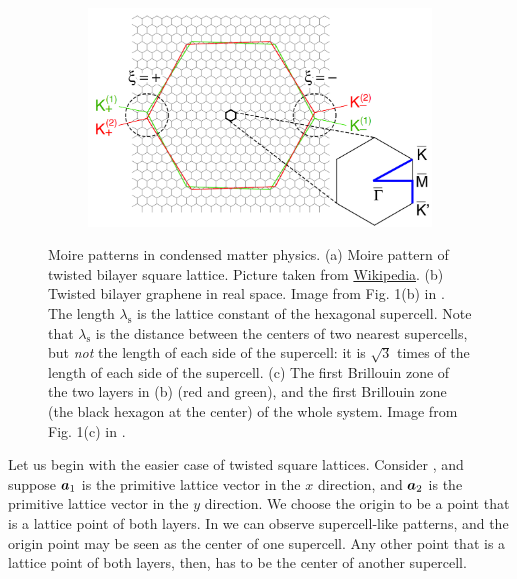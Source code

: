\documentclass[hyperref, a4paper]{article}
\begin{document}
\begin{figure}
\begin{subfigure}{0.3\textwidth}
        \subcaption{}
        \label{fig:hexagonal-moire}
    \end{subfigure}
    \begin{subfigure}{0.3\textwidth}
        \centering
        \includegraphics[width=\textwidth]{structure/moire-k-graphene.PNG}
        \subcaption{}
        \label{fig:1bz-1}
    \end{subfigure}
    \caption{Moire patterns in condensed matter physics.
    (a) Moire pattern of twisted bilayer square lattice. 
    Picture taken from \href{https://en.wikipedia.org/wiki/Moir\%C3\%A9\_pattern\#/media/File:Moir\%C3\%A9\_grid.svg}{Wikipedia}.
    (b) Twisted bilayer graphene in real space. Image from Fig. 1(b) in \cite{padhi_doped_2018}.
    The length $\lambda_\text{s}$ is the lattice constant of the hexagonal supercell.
    Note that $\lambda_{\text{s}}$ is the distance between the centers of two nearest supercells,
    but \emph{not} the length of each side of the supercell:
    it is $\sqrt{3}$ times of the length of each side of the supercell.
    (c) The first Brillouin zone of the two layers in (b) (red and green),
    and the first Brillouin zone (the black hexagon at the center) of the whole system.
    Image from Fig. 1(c) in \cite{koshino_band_2019}.
    }
\end{figure}

Let us begin with the easier case of twisted square lattices.
Consider , 
and suppose $\vb*{a}_1$ is the primitive lattice vector in the $x$ direction,
and $\vb*{a}_2$ is the primitive lattice vector in the $y$ direction.
We choose the origin to be a point 
that is a lattice point of both layers.
In  we can observe supercell-like patterns,
and the origin point may be seen as the center of one supercell.
Any other point that is a lattice point of both layers, then,
has to be the center of another supercell.
\end{document}
